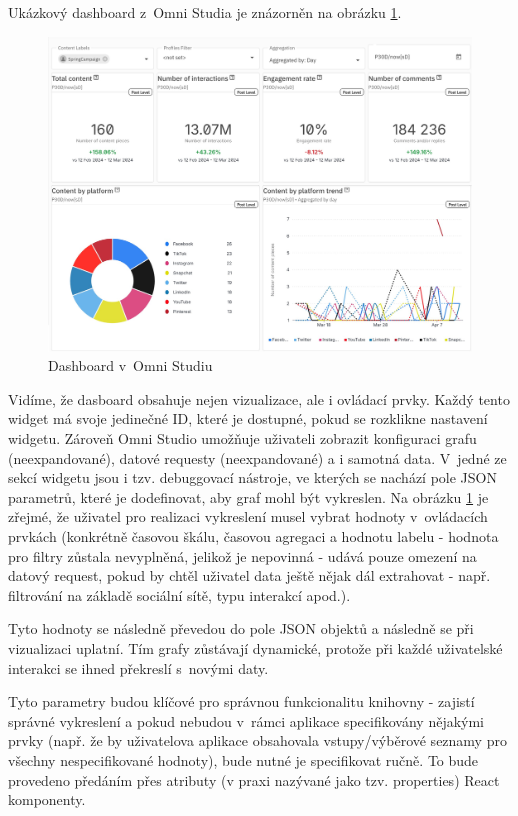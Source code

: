 \documentclass[czech, bc, kiv, he, iso690numb]{fasthesis}
\begin{document}
Ukázkový dashboard z~Omni Studia je znázorněn na obrázku \ref{fig:omniStudioDashboard}.
\begin{figure}
	\centering
	\includegraphics[width=1\textwidth]{pictures/omni-studio.png}
	\caption{Dashboard v~Omni Studiu}
	\label{fig:omniStudioDashboard}
\end{figure}
Vidíme, že dasboard obsahuje nejen vizualizace, ale i ovládací prvky. Každý tento widget má svoje jedinečné ID, které je dostupné, pokud se rozklikne nastavení widgetu. Zároveň Omni Studio 
umožňuje uživateli zobrazit konfiguraci grafu (neexpandované), datové requesty (neexpandované) a i samotná data. V~jedné ze sekcí widgetu jsou i tzv. debuggovací nástroje, ve kterých se nachází pole JSON parametrů,
které je dodefinovat, aby graf mohl být vykreslen. Na obrázku \ref{fig:omniStudioDashboard} je zřejmé, že uživatel pro realizaci vykreslení musel vybrat hodnoty v~ovládacích prvkách (konkrétně 
časovou škálu, časovou agregaci a hodnotu labelu - hodnota pro filtry zůstala nevyplněná, jelikož je nepovinná - udává pouze omezení na datový request, pokud by chtěl uživatel data ještě nějak
dál extrahovat - např. filtrování na základě sociální sítě, typu interakcí apod.). 

Tyto hodnoty se následně převedou do pole JSON objektů a následně se při vizualizaci uplatní. Tím grafy zůstávají dynamické, protože při každé uživatelské interakci se ihned překreslí s~novými
daty.

Tyto parametry budou klíčové pro správnou funkcionalitu knihovny - zajistí správné vykreslení a pokud nebudou v~rámci aplikace specifikovány nějakými prvky (např. že by uživatelova aplikace obsahovala
vstupy/výběrové seznamy pro všechny nespecifikované hodnoty), bude nutné je specifikovat ručně. To bude provedeno předáním přes atributy (v praxi nazývané jako tzv. properties) React komponenty.
\end{document}
